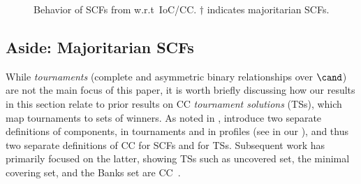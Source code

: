 \begin{figure}[t]
    \centering
{}
\caption{Behavior of SCFs from  w.r.t~IoC/CC. $\dagger$ indicates majoritarian SCFs.}\label{fig:diagram}
\end{figure}

\subsection{Aside: Majoritarian SCFs}\label{sec:majoritarian}

While \emph{tournaments} (complete and asymmetric binary relationships over $\cand$) are not the main focus of this paper, it is worth briefly discussing how our results in this section relate to prior results on CC \emph{tournament solutions} (TSs), which map tournaments to sets of winners. As noted in , \citet{Laffond96:Composition}  introduce two separate definitions of components, in tournaments and in profiles (see  in our ), and thus two separate definitions of CC for SCFs and for TSs. Subsequent work has primarily focused on the latter, showing TSs such as uncovered set, the minimal covering set, and the Banks set are CC~\citep{Laffond96:Composition,Laslier97:Tournament}. 

